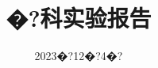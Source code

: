 \documentclass{zjureport}
\title{�?科实验报告}
\date{2023�?12�?4�?}
\begin{document}
	
\makecover







\end{document}
